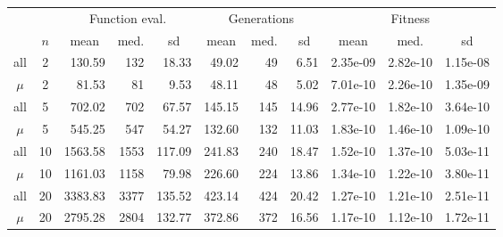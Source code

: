 {\renewcommand{\arraystretch}{1.1} \renewcommand{\tabcolsep}{0.1cm} %
\begin{tabular}{ c  c | rrr | rrr| rrr }
\toprule
 & & \multicolumn{3}{c|}{Function eval.} & \multicolumn{3}{c|}{Generations} & \multicolumn{3}{c}{Fitness} \\ 
     & $n$ & \multicolumn{1}{c}{mean} & \multicolumn{1}{c}{med.} & \multicolumn{1}{c|}{sd} & \multicolumn{1}{c}{mean} & \multicolumn{1}{c}{med.} & \multicolumn{1}{c|}{sd} & \multicolumn{1}{c}{mean} & \multicolumn{1}{c}{med.} & \multicolumn{1}{c}{sd} \\
\midrule
all& 2 & 130.59 & 132 & 18.33 & 49.02 & 49 & 6.51 & 2.35e-09 & 2.82e-10 & 1.15e-08\\ 
$\mu$&2 & 81.53 & 81 & 9.53 & 48.11 & 48 & 5.02 & 7.01e-10 & 2.26e-10 & 1.35e-09\\ \midrule
all& 5 & 702.02 & 702 & 67.57 & 145.15 & 145 & 14.96 & 2.77e-10 & 1.82e-10 & 3.64e-10\\ 
$\mu$& 5 & 545.25 & 547 & 54.27 & 132.60 & 132 & 11.03 & 1.83e-10 & 1.46e-10 & 1.09e-10\\ \midrule
all& 10 & 1563.58 & 1553 & 117.09 & 241.83 & 240 & 18.47 & 1.52e-10 & 1.37e-10 & 5.03e-11\\ 
$\mu$& 10 & 1161.03 & 1158 & 79.98 & 226.60 & 224 & 13.86 & 1.34e-10 & 1.22e-10 & 3.80e-11\\ \midrule
all& 20 & 3383.83 & 3377 & 135.52 & 423.14 & 424 & 20.42 & 1.27e-10 & 1.21e-10 & 2.51e-11\\ 
$\mu$& 20 & 2795.28 & 2804 & 132.77 & 372.86 & 372 & 16.56 & 1.17e-10 & 1.12e-10 & 1.72e-11\\ 
\bottomrule
\end{tabular}
}